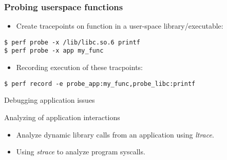 \begin{frame}[fragile]
  \frametitle{Probing userspace functions}
  \begin{itemize}
    \item Create tracepoints on function in a user-space library/executable: 
  \end{itemize}
  \begin{block}{}
    \begin{verbatim}
$ perf probe -x /lib/libc.so.6 printf
$ perf probe -x app my_func
    \end{verbatim}
  \end{block}
  \begin{itemize}
    \item Recording execution of these tracpoints: 
  \end{itemize}
  \begin{block}{}
    \begin{verbatim}
$ perf record -e probe_app:my_func,probe_libc:printf
    \end{verbatim}
  \end{block}
\end{frame}

\setuplabframe
{Debugging application issues}
{
  Analyzing of application interactions
  \begin{itemize}
    \item Analyze dynamic library calls from an application using
            {\em ltrace}.
    \item Using {\em strace} to analyze program syscalls.
  \end{itemize}
}